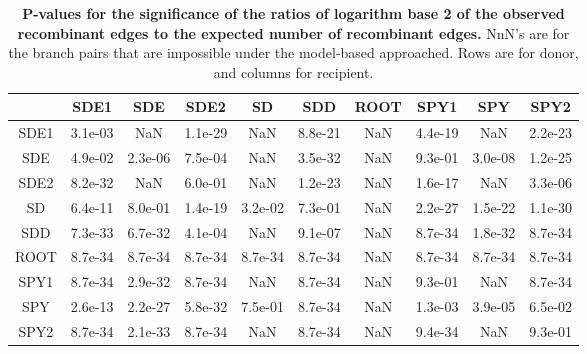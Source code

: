 \documentclass[10pt]{article}
\begin{document}
\begin{table}[!ht]
\caption{
{\bf P-values for the significance of the ratios of logarithm base 2 of the observed
recombinant edges to the expected number of recombinant edges.} 
NnN's are for the branch pairs that are impossible under the model-based
approached. Rows are for donor, and columns for recipient.}
\noindent \centering{}\begin{tabular}{cccccccccc}
\hline
&         SDE1&     SDE&    SDE2&      SD&     SDD &ROOT&    SPY1&     SPY&    SPY2\\
\hline
SDE1 &3.1e-03 &    NaN &1.1e-29 &    NaN &8.8e-21  &NaN &4.4e-19 &    NaN &2.2e-23\\
SDE  &4.9e-02 &2.3e-06 &7.5e-04 &    NaN &3.5e-32  &NaN &9.3e-01 &3.0e-08 &1.2e-25\\
SDE2 &8.2e-32 &    NaN &6.0e-01 &    NaN &1.2e-23  &NaN &1.6e-17 &    NaN &3.3e-06\\
SD   &6.4e-11 &8.0e-01 &1.4e-19 &3.2e-02 &7.3e-01  &NaN &2.2e-27 &1.5e-22 &1.1e-30\\
SDD  &7.3e-33 &6.7e-32 &4.1e-04 &    NaN &9.1e-07  &NaN &8.7e-34 &1.8e-32 &8.7e-34\\
ROOT &8.7e-34 &8.7e-34 &8.7e-34 &8.7e-34 &8.7e-34  &NaN &8.7e-34 &8.7e-34 &8.7e-34\\
SPY1 &8.7e-34 &2.9e-32 &8.7e-34 &    NaN &8.7e-34  &NaN &9.3e-01 &    NaN &8.7e-34\\
SPY  &2.6e-13 &2.2e-27 &5.8e-32 &7.5e-01 &8.7e-34  &NaN &1.3e-03 &3.9e-05 &6.5e-02\\
SPY2 &8.7e-34 &2.1e-33 &8.7e-34 &    NaN &8.7e-34  &NaN &9.4e-34 &    NaN &9.3e-01\\
\hline
\end{tabular}
\label{tab:heatmappvalue}
\end{table}
\end{document}
